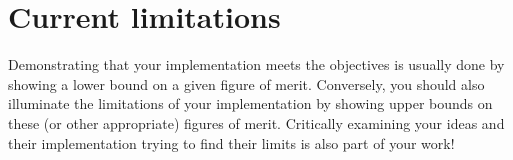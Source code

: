 



\section{Current limitations}

Demonstrating that your implementation meets the objectives is usually done by showing a lower bound on a given figure of merit.
Conversely, you should also illuminate the limitations of your implementation by showing upper bounds on these (or other appropriate) figures of merit.
Critically examining your ideas and their implementation trying to find their limits is also part of your work!
